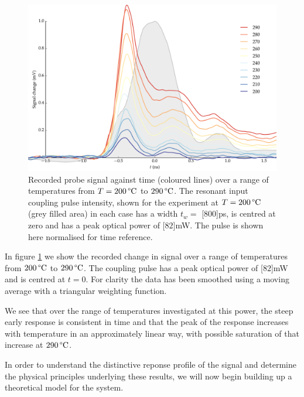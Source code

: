     \begin{figure}[h]
      \includegraphics[width=\linewidth]
        {figs/06_simultons/1704_temp_scaled_data_colormap_fig1.pdf}
      \caption{
      Recorded probe signal against time (coloured lines) over a range  of
      temperatures from $T = \unit[200]{\textrm{\textdegree C}}$ to
      $\unit[290]{\textrm{\textdegree C}}$.  The resonant input coupling pulse
      intensity, shown for the experiment at $T = \unit[200]{\textrm{\textdegree
      C}}$ (grey filled area) in each case  has a width $t_w = $
      \unit[$800$]{ps}, is centred at zero and has a peak  optical power of
      \unit[$82$]{mW}. The pulse is shown here normalised for  time reference.
      }
      \label{fig:data_0703_temp_all}
    \end{figure}

    In figure \ref{fig:data_0703_temp_all} we show the recorded change in signal
    over a range of temperatures from $\unit[200]{\textrm{\textdegree C}}$ to
    $\unit[290]{\textrm{\textdegree C}}$. The coupling pulse has a peak optical
    power of \unit[$82$]{mW} and is centred at $t = 0$. For clarity the data has
    been smoothed using a moving average with a triangular weighting function.

    We see that over the range of temperatures investigated at this power, the
    steep early response is consistent in time and that the peak of the response
    increases with temperature in an approximately linear way, with possible saturation of that increase at $\unit[290]{\textrm{\textdegree C}}$.

    In order to understand the distinctive reponse profile of the signal and
    determine the physical principles underlying these results, we will now
    begin building up a theoretical model for the system.
